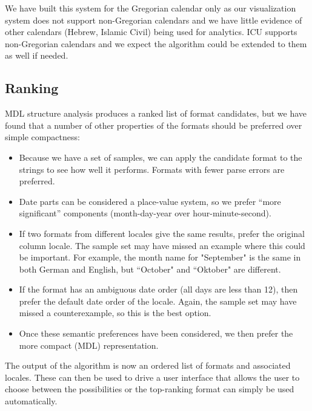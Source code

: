 We have built this system for the Gregorian calendar only as our visualization system does not support non-Gregorian calendars and we have little evidence of other calendars (\eg Hebrew, Islamic Civil) being used for analytics. ICU supports non-Gregorian calendars and we expect the algorithm could be extended to them as well if needed.

\subsection{Ranking}
MDL structure analysis produces a ranked list of format candidates, but we have found that a number of other properties of the formats should be preferred over simple compactness:
\begin{itemize}
\setlength\itemsep{0em}
\item Because we have a set of samples, we can apply the candidate format to the strings to see how well it performs. Formats with fewer parse errors are preferred.
\item Date parts can be considered a place-value system, so we prefer ``more significant'' components (\eg month-day-year over hour-minute-second).
\item If two formats from different locales give the same results, prefer the original column locale. The sample set may have missed an example where this could be important. For example, the month name for "September" is the same in both German and English, but ``October" and ``Oktober" are different.
\item If the format has an ambiguous date order (\eg all days are less than 12), then prefer the default date order of the locale. Again, the sample set may have missed a counterexample, so this is the best option.
\item Once these semantic preferences have been considered, we then prefer the more compact (MDL) representation.
\end{itemize}

The output of the algorithm is now an ordered list of formats and associated locales. These can then be used to drive a user interface that allows the user to choose between the possibilities or the top-ranking format can simply be used automatically.
